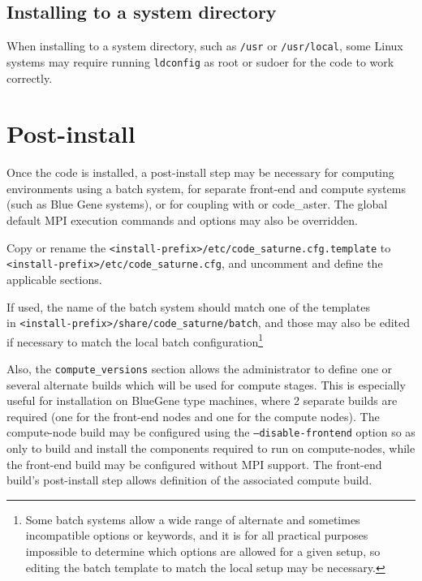 \documentclass[a4paper,10pt,twoside]{csshortdoc}
\begin{document}
\subsection{Installing to a system directory\label{sec:sys_install}}

When installing to a system directory, such as \texttt{/usr}
or \texttt{/usr/local}, some Linux systems may require running
\texttt{ldconfig} as root or sudoer for the code to work correctly.

\section{Post-install\label{sec:post_install}}

Once the code is installed, a post-install step may
be necessary for computing environments using a batch system,
for separate front-end and compute systems (such as Blue Gene
systems), or for coupling with  or code\_aster.
The global default MPI execution commands and options may also be overridden.

Copy or rename the \texttt{<install-prefix>/etc/code\_saturne.cfg.template} to \\
\texttt{<install-prefix>/etc/code\_saturne.cfg},
and uncomment and define the applicable sections.

If used, the name of the batch system should match one of the templates \\
in \texttt{<install-prefix>/share/code\_saturne/batch},
and those may also be edited if necessary to match the local
batch configuration\footnote{Some batch systems allow a wide
range of alternate and sometimes incompatible options or keywords,
and it is for all practical purposes impossible to determine
which options are allowed for a given setup, so editing the
batch template to match the local setup may be necessary.}

Also, the \texttt{compute\_versions} section allows the administrator
to define one or several alternate builds which will be used for
compute stages. This is especially useful for installation
on BlueGene type machines, where 2 separate builds are required
(one for the front-end nodes and one for the compute nodes).
The compute-node build may be configured using the
\texttt{--disable-frontend} option so as only to build and install
the components required to run on compute-nodes,
while the front-end build may be configured without MPI support.
The front-end build's post-install step allows definition of
the associated compute build.
\end{document}
